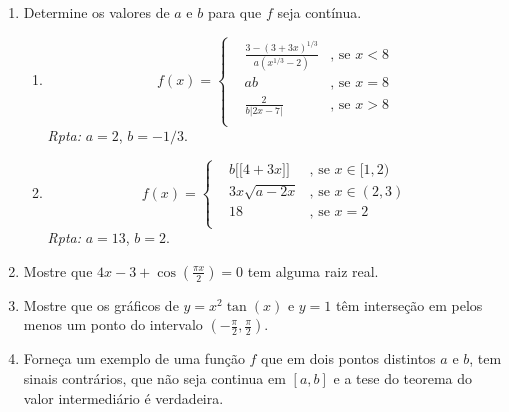 \documentclass[latin,20pt]{article}
\begin{document}
\begin{enumerate}
\begin{itemize}
$$            \begin{array}{lll}
    &\frac{x^4-x^2+x-1}{x-1} &\text{, se } x \neq 1 \\
    & a    &\text{, se } x=1\\
            \end{array}
            \right. 
    $$
    {\it Rpta: } $a=3$
      \item $$
    f(x)= \left\{  
            \begin{array}{lll}
    &\frac{\sqrt{-x}-1}{x+1} &\text{, se } x <-1 \\
    & x+a    &\text{, se } x \in [1,\infty) \\
            \end{array}
            \right. 
    $$
    {\it Rpta:} $a=1/2$.
      \end{itemize} 
    \item    Determine os valores de $a$  e $b$ para que $f$ seja contínua.            
       \begin{enumerate}
       \item 
       $$
    f(x)= \left\{  
            \begin{array}{lll}
    &\frac{3-(3+3x)^{1/3}}{a(x^{1/3}-2)} &\text{, se } x < 8 \\
    &ab    &\text{, se } x=8\\
    &\frac{2}{b|2x-7|}    &\text{, se } x>8\\
            \end{array}
            \right. 
    $$
       {\it Rpta: } $a=2$, $b=-1/3$.
       \item 
       $$
    f(x)= \left\{  
            \begin{array}{lll}
    &b \lbrack\!\lbrack 4+3x \rbrack\!\rbrack &\text{, se } x \in [1,2) \\
    &3x\sqrt{a-2x}    &\text{, se } x \in (2,3)\\
    &18    &\text{, se } x=2\\
            \end{array}
            \right. 
    $$
       {\it Rpta: } $a=13$, $b=2$.
       \end{enumerate}
    \item Mostre que 
    $4x-3+\cos(\frac{\pi x}{2})=0$ tem 
    alguma raiz real.
    \item Mostre que os gráficos de 
    $y=x^{2}\tan(x)$ e $y=1$ têm 
    interseção em pelos menos 
    um ponto do intervalo 
    $(-\frac{\pi}{2}, \frac{\pi}{2})$. 
    \item Forneça um exemplo de uma função $f$ que em dois pontos distintos $a$ e $b$, tem sinais contrários, que não seja continua em $[a,b]$ e a tese do teorema do valor intermediário é verdadeira.

\end{enumerate}
\end{document}
